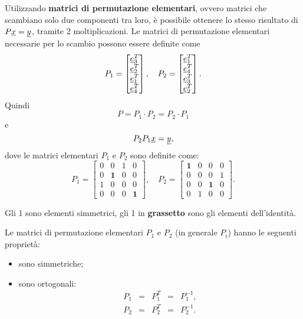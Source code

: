 Utilizzando \textbf{matrici di permutazione elementari}, ovvero matrici che scambiano solo due componenti tra loro, è possibile ottenere lo stesso risultato di $P\uline x=\uline y$, tramite 2 moltiplicazioni. Le matrici di permutazione elementari necessarie per lo scambio possono essere definite come
\begin{equation*}
    P_1=
    \begin{bmatrix}
        \uline e_3^T\\
        \uline e_2^T\\
        \uline e_1^T\\
        \uline e_4^T
    \end{bmatrix},\quad
    P_2=
    \begin{bmatrix}
        \uline e_1^T\\
        \uline e_4^T\\
        \uline e_3^T\\
        \uline e_2^T
    \end{bmatrix}.
\end{equation*}
Quindi
\begin{equation*}
	P=P_1\cdot P_2=P_2\cdot P_1
\end{equation*}
e
\begin{equation*}
	P_2P_1\uline x=\uline y,
\end{equation*}
 dove le matrici elementari $P_1$ e $P_2$ sono definite come:
\begin{equation*}
    P_1 =
    \begin{bmatrix}
        0 & 0 & \boxed{1} & 0\\
        0 & \boldsymbol 1 & 0 & 0 \\
        \boxed{1} & 0 & 0 & 0 \\
        0 & 0 & 0 &\boldsymbol 1
    \end{bmatrix},\quad
    P_2 =
    \begin{bmatrix}
        \boldsymbol 1 & 0 & 0 & 0\\
        0 & 0 & 0 & \boxed{1}\\
        0 & 0 & \boldsymbol 1 & 0\\
        0 & \boxed{1} & 0 & 0
    \end{bmatrix}.
\end{equation*}

Gli 1  sono elementi simmetrici, gli 1 in \textbf{grassetto} sono gli elementi dell'identità.

Le matrici di permutazione elementari $P_1$ e $P_2$ (in generale $P_i$) hanno le seguenti proprietà:
\begin{itemize}
    \item sono simmetriche;
    \item sono ortogonali:\begin{equation*}
        \begin{matrix}
            P_1 & = & P_1^T & = & P_1^{-1},\\
            P_2 & = & P_2^T & = & P_2^{-1}.
        \end{matrix}
    \end{equation*}
\end{itemize}

